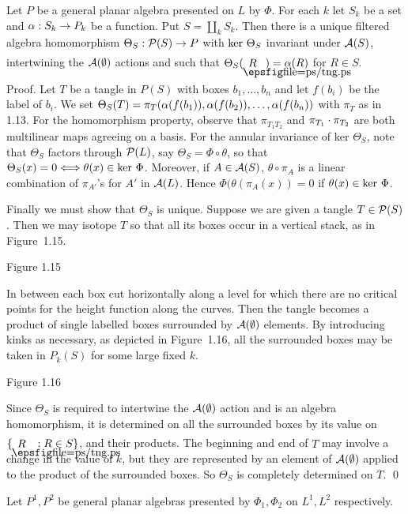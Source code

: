 \bigskip
{} Let $P$ be a general planar
algebra presented on $L$ by $\Phi$. For each $k$ let $S_k$ be a set
and
$\a:S_k\to P_k$ be a function. Put $S=\coprod_k S_k$. Then there is
a unique filtered algebra homomorphism
$\Theta_S:\P(S)\to P$ with ${\op{ker}} \ \Theta_S$ invariant under
${\cal A}(S)$, intertwining the ${\cal A}(\emptyset)$ actions and such that
$\Theta_S(\tangle{R})=\a(R)$ for $R\in S$.

{\sc Proof}. Let $T$ be a tangle in $P(S)$ with boxes
$b_1,\dots ,b_n$ and let $f(b_i)$ be the label of $b_i$.
We set $\Theta_S(T)=\pi_T(\a(f(b_1)),\a(f(b_2)),\dots ,\a(f(b_n))$
with $\pi_T$ as in 1.13. For the homomorphism property, observe
that $\pi_{T_1T_2}$ and $\pi_{T_1}\dt\pi_{T_2}$ are both
multilinear maps agreeing on a basis. For the annular invariance of
ker $\Theta_S$, note that $\Theta_S$ factors through $\P(L)$, say
$\Theta_S=\Phi\circ \theta$, so that
$\Theta_S(x)=0\Longleftrightarrow
\th(x)\in{\op{ker}} \ \Phi$. Moreover, if $A\in{\cal A}(S)$,
$\theta\!\circ\!\pi_A$ is a linear combination of $\pi_{A'}$'s for
$A'$ in ${\cal A}(L)$. Hence $\Phi(\theta(\pi_A(x))=0$ if
$\theta(x)\in {\op{ker}} \ \Phi$.

Finally we must show that $\Theta_S$ is unique. Suppose we are
given a tangle $T\in \P(S)$. Then we may isotope $T$ so that all its
boxes occur in a vertical stack, as in Figure~1.15.
\[
        
\]
\begin{center}
Figure 1.15
\end{center}

\bs In between each box cut horizontally along a level for which
there are no critical points for the height function along the
curves. Then the tangle becomes a product of single labelled boxes
surrounded by ${\cal A}(\emptyset)$ elements. By introducing kinks as
necessary, as depicted in Figure~1.16, all the surrounded boxes may
be taken in $P_k(S)$ for some large fixed $k$.
\[
        
\]
\begin{center}
Figure 1.16
\end{center}


\bs\ni Since $\Theta_S$ is required to intertwine the $\cal
A(\emptyset)$ action and is an algebra homomorphism, it is determined on
all the surrounded boxes by its value on $\{\tangle{R} : R\in
S\}$, and their products. The beginning and end of $T$ may involve a
change in the value of $k$, but they are represented by an element
of ${\cal A}(\emptyset)$ applied to the product of the surrounded boxes.
So $\Theta_S$ is completely determined on $T$. \qed


 Let $P^1,P^2$  be general planar algebras
presented by $\Phi_1,\Phi_2$ on $L^1,L^2$ respectively.



